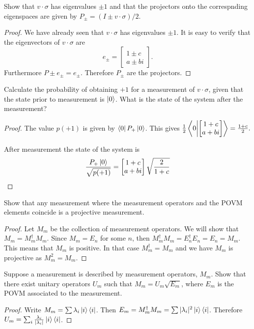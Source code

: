 \documentclass{article}
\begin{document}
\begin{exercise}
  Show that $v\cdot\sigma$ has eigenvalues $\pm1$ and that the projectors onto the correspnding eigenspaces are given by $P_\pm=(I\pm v\cdot\sigma)/2$.
  \begin{proof}
    We have already seen that $v\cdot\sigma$ has eigenvalues $\pm1$. It is easy to verify that the eigenvectors of $v\cdot\sigma$ are
    \[e_\pm=\begin{bmatrix}
      1\pm c \\
      a\pm bi
    \end{bmatrix}.\]
    Furthermore $P\pm e_\pm = e_\pm.$ Therefore $P_\pm$ are the projectors.
  \end{proof}
\end{exercise}

\begin{exercise}
  Calculate the probability of obtaining $+1$ for a measurement of $v\cdot\sigma$, given that the state prior to measurement is $\ket0$. What is the state of the system after the measurement?
  \begin{proof}
    The value $p(+1)$ is given by $\bra0P_+\ket0$. This gives
  $\frac{1}{2}\bra0\ket{\begin{bmatrix}
    1+c \\
    a+bi
  \end{bmatrix}}=\frac{1+c}{2}.$

  After measurement the state of the system is \[\frac{P_+\ket0}{\sqrt{p(+1)}}=\begin{bmatrix}
    1+c \\
    a+bi
  \end{bmatrix}\sqrt\frac{2}{1+c}\]
  \end{proof}
\end{exercise}

\begin{exercise}
  Show that any measurement where the measurement operators and the POVM elements coincide is a projective measurement.
  \begin{proof}
    Let $M_m$ be the collection of measurement operators. We will show that $M_m=M_m^\dagger M_m$. Since $M_m=E_n$ for some $n$, then $M_m^\dagger M_m=E_n^\dagger E_n=E_n=M_m$. This means that $M_m$ is positive. In that case $M_m^\dagger = M_m$ and we have $M_m$ is projective as $M_m^2=M_m$.
  \end{proof}
\end{exercise}

\begin{exercise}
  Suppose a measurement is described by measurement operators, $M_m$. Show that there exist unitary operators $U_m$ such that $M_m=U_m\sqrt{E_m}$, where $E_m$ is the POVM associated to the measurement.
  \begin{proof}
    Write $M_m=\sum \lambda_i\ket{i}\bra{i}$. Then $E_m=M_m^\dagger M_m=\sum |\lambda_i|^2\ket{i}\bra{i}$. Therefore $U_m=\sum_i\frac{\lambda_i}{|\lambda_i|}\ket{i}\bra{i}$.
  \end{proof}
\end{exercise}
\end{document}
